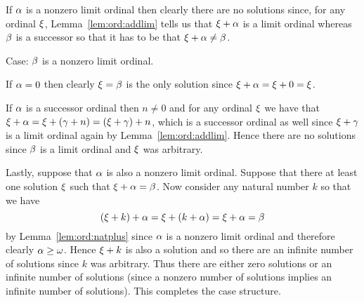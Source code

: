 {{If $\alpha$ is a nonzero limit ordinal then clearly there are no solutions since, for any ordinal $\xi$, Lemma~\ref{lem:ord:addlim} tells us that $\xi + \alpha$ is a limit ordinal whereas $\beta$ is a successor so that it has to be that $\xi + \alpha \neq \beta$.

Case: $\beta$ is a nonzero limit ordinal.

If $\alpha = 0$ then clearly $\xi = \beta$ is the only solution since $\xi + \alpha = \xi + 0 = \xi$.

If $\alpha$ is a successor ordinal then $n \neq 0$ and for any ordinal $\xi$ we have that $\xi + \alpha = \xi + (\gamma + n) = (\xi + \gamma) + n$, which is a successor ordinal as well since $\xi + \gamma$ is a limit ordinal again by Lemma~\ref{lem:ord:addlim}.
Hence there are no solutions since $\beta$ is a limit ordinal and $\xi$ was arbitrary.

Lastly, suppose that $\alpha$ is also a nonzero limit ordinal.
Suppose that there at least one solution $\xi$ such that $\xi + \alpha = \beta$.
Now consider any natural number $k$ so that we have
$$
  (\xi + k) + \alpha = \xi + (k + \alpha) = \xi + \alpha = \beta
$$
by Lemma~\ref{lem:ord:natplus} since $\alpha$ is a nonzero limit ordinal and therefore clearly $\alpha \geq \omega$.
Hence $\xi + k$ is also a solution and so there are an infinite number of solutions since $k$ was arbitrary.
Thus there are either zero solutions or an infinite number of solutions (since a nonzero number of solutions implies an infinite number of solutions).
This completes the case structure.

}}

